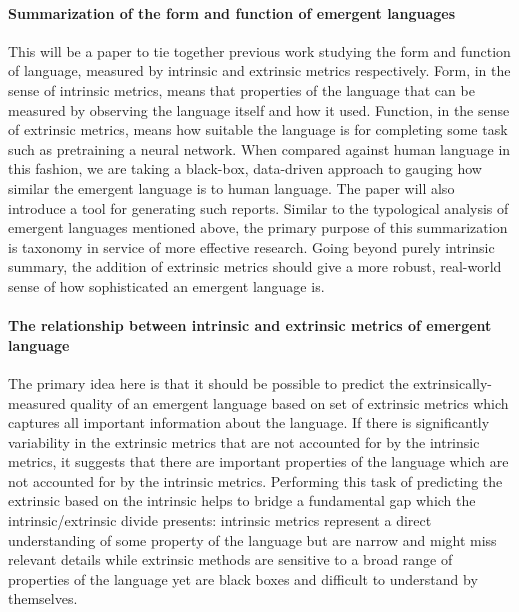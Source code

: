 \paragraph{Summarization of the form and function of emergent languages}
This will be a paper to tie together previous work studying the form and function of language, measured by intrinsic and extrinsic metrics respectively.
Form, in the sense of intrinsic metrics, means that properties of the language that can be measured by observing the language itself and how it used.
Function, in the sense of extrinsic metrics, means how suitable the language is for completing some task such as pretraining a neural network.
When compared against human language in this fashion, we are taking a black-box, data-driven approach to gauging how similar the emergent language is to human language.
The paper will also introduce a tool for generating such reports.
Similar to the typological analysis of emergent languages mentioned above, the primary purpose of this summarization is taxonomy in service of more effective research.
Going beyond purely intrinsic summary, the addition of extrinsic metrics should give a more robust, real-world sense of how sophisticated an emergent language is. 

\paragraph{The relationship between intrinsic and extrinsic metrics of emergent language}
The primary idea here is that it should be possible to predict the extrinsically-measured quality of an emergent language based on set of extrinsic metrics which captures all important information about the language.
If there is significantly variability in the extrinsic metrics that are not accounted for by the intrinsic metrics, it suggests that there are important properties of the language which are not accounted for by the intrinsic metrics.
Performing this task of predicting the extrinsic based on the intrinsic helps to bridge a fundamental gap which the intrinsic/extrinsic divide presents:
    intrinsic metrics represent a direct understanding of some property of the language but are narrow and might miss relevant details while extrinsic methods are sensitive to a broad range of properties of the language yet are black boxes and difficult to understand by themselves. 


